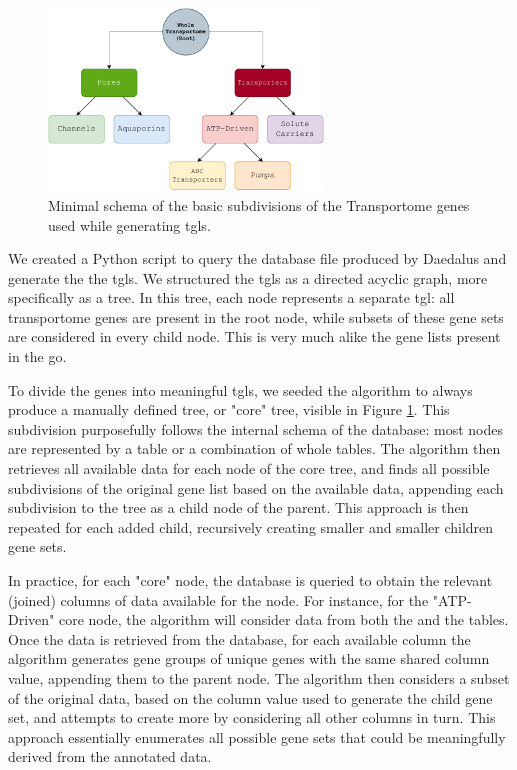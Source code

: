 \begin{figure}
    \centering
    \includegraphics[width=0.65\textwidth]{resources/images/BasicTree.pdf}
    \caption{Minimal schema of the basic subdivisions of the Transportome genes used while generating \glspl{tgl}.}
    \label{fig:BasicTree}
\end{figure}

We created a Python script to query the database file produced by Daedalus and
generate the the \glspl{tgl}. We structured the \glspl{tgl} as a directed
acyclic graph, more specifically as a tree. In this tree, each node represents a
separate \gls{tgl}: all transportome genes are present in the root node, while
subsets of these gene sets are considered in every child node. This is very much
alike the gene lists present in the \gls{go}.

To divide the genes into meaningful \glspl{tgl}, we seeded the algorithm to
always produce a manually defined tree, or "core" tree, visible in Figure
\ref{fig:BasicTree}. This subdivision purposefully follows the internal schema
of the database: most nodes are represented by a table or a combination of whole
tables. The algorithm then retrieves all available data for each node of the
core tree, and finds all possible subdivisions of the original gene list based
on the available data, appending each subdivision to the tree as a child node of
the parent. This approach is then repeated for each added child, recursively
creating smaller and smaller children gene sets.

In practice, for each "core" node, the database is queried to obtain the
relevant (joined) columns of data available for the node. For instance, for the
"ATP-Driven" core node, the algorithm will consider data from both the
 and the  tables. Once
the data is retrieved from the database, for each available column the algorithm
generates gene groups of unique genes with the same shared column value,
appending them to the parent node. The algorithm then considers a subset of the
original data, based on the column value used to generate the child gene set,
and attempts to create more by considering all other columns in turn. This
approach essentially enumerates all possible gene sets that could be
meaningfully derived from the annotated data. 

